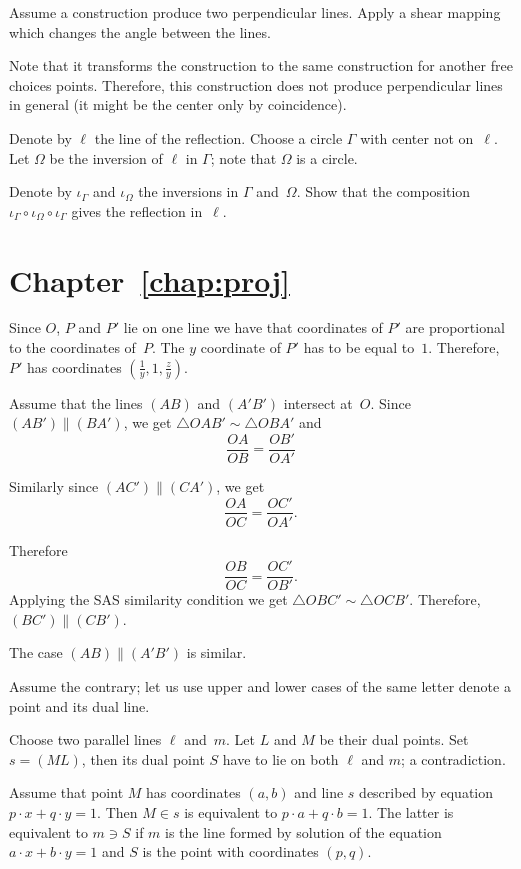 Assume a construction produce  two perpendicular lines.
Apply a shear mapping which changes the angle between the lines.

Note that it transforms the construction to the same construction for another free choices points.
Therefore, this construction does not produce perpendicular lines in general
 (it might be the center only by coincidence).
 
Denote by $\ell$ the line of the reflection.
Choose a circle $\Gamma$ with center not on~$\ell$.
Let $\Omega$ be the inversion of $\ell$ in $\Gamma$;
note that $\Omega$ is a circle.

Denote by $\iota_\Gamma$ and $\iota_\Omega$ 
the inversions in $\Gamma$ and~$\Omega$.
Show that the composition 
$\iota_\Gamma\circ\iota_\Omega\circ\iota_\Gamma$
gives the reflection in~$\ell$.


\section*{Chapter~\ref{chap:proj}}
\setcounter{eqtn}{0}

Since $O$, $P$ and $P'$ lie on one line we have
that coordinates of $P'$ are proportional to the coordinates of~$P$.
The $y$ coordinate of $P'$ has to be equal to~$1$.
Therefore, $P'$ has coordinates 
$(\tfrac1y,1,\tfrac zy)$.


Assume that the lines $(AB)$ and $(A'B')$ intersect at~$O$.
Since $(AB')\parallel (BA')$, we get $\triangle OAB'\sim\triangle OBA'$
and
\[\frac{OA}{OB}=\frac{OB'}{OA'}\]

Similarly since $(AC')\parallel (CA')$, 
we get 
\[\frac{OA}{OC}=\frac{OC'}{OA'}.\]

Therefore
\[\frac{OB}{OC}=\frac{OC'}{OB'}.\]
Applying the SAS similarity condition we get
$\triangle OBC'\sim\triangle OCB'$.
Therefore, $(BC')\parallel (CB')$.

The case $(AB)\parallel(A'B')$ is similar.

Assume the contrary; let us use upper and lower cases of the same letter denote a point and its dual line.

Choose two parallel lines $\ell$ and~$m$.
Let $L$ and $M$ be their dual points.
Set $s=(ML)$, then its dual point $S$ have to lie on both $\ell$ and $m$;
a contradiction.

Assume that point $M$ has coordinates $(a,b)$ 
and line $s$ described by equation $p\cdot x+q\cdot y=1$.
Then $M\in s$ is equivalent to $p\cdot a+q\cdot b=1$.
The latter is equivalent to $m\ni S$
if $m$ is the line formed by solution of the equation 
$a\cdot x+b\cdot y=1$ and $S$ is the point with coordinates $(p,q)$.

